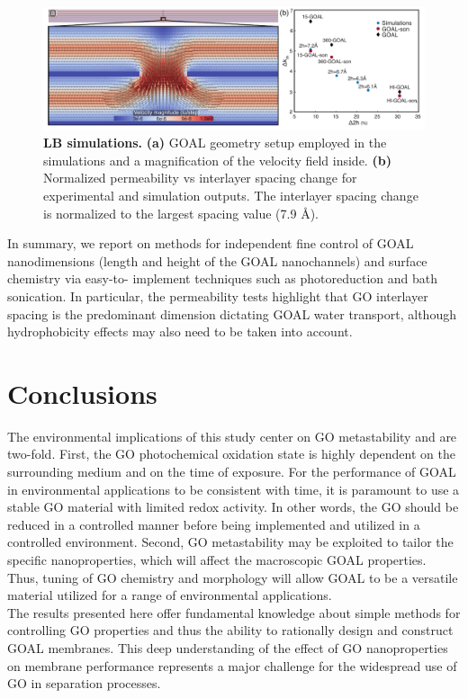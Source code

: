 \begin{figure}[h]
  \centering
  \includegraphics[width=6in]{paper4/Fig6.pdf}
  \caption{\textbf{LB simulations.} \textbf{(a)} GOAL geometry setup employed in the simulations and a magnification of the velocity field inside. \textbf{(b)} Normalized permeability vs interlayer spacing change for experimental and simulation outputs. The interlayer spacing change is normalized to the largest spacing value (7.9 {\AA}).}
  \label{Fig6_pap4}
\end{figure}
In summary, we report on methods for independent fine control of GOAL nanodimensions (length and height of the GOAL nanochannels) and surface chemistry via easy-to- implement techniques such as photoreduction and bath sonication. In particular, the permeability tests highlight that GO interlayer spacing is the predominant dimension dictating GOAL water transport, although hydrophobicity effects may also need to be taken into account. 

\section{Conclusions}
The environmental implications of this study center on GO metastability and are two-fold. First, the GO photochemical oxidation state is highly dependent on the surrounding medium and on the time of exposure. For the performance of GOAL in environmental applications to be consistent with time, it is paramount to use a stable GO material with limited redox activity. In other words, the GO should be reduced in a controlled manner before being implemented and utilized in a controlled environment. Second, GO metastability may be exploited to tailor the specific nanoproperties, which will affect the macroscopic GOAL properties. Thus, tuning of GO chemistry and morphology will allow GOAL to be a versatile material utilized for a range of environmental applications.\\
The results presented here offer fundamental knowledge about simple methods for controlling GO properties and thus the ability to rationally design and construct GOAL membranes. This deep understanding of the effect of GO nanoproperties on membrane performance represents a major challenge for the widespread use of GO in separation processes.

